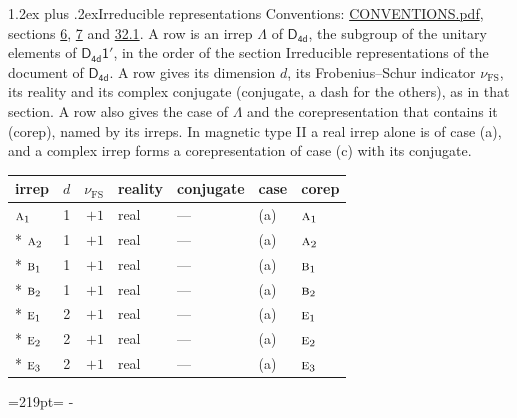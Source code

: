 \documentclass[10pt,a4paper]{article}
\makeatletter
\renewcommand\section{\@startsection{section}{1}{\z@}{-3ex plus -1ex minus -.2ex}%
  {1.2ex plus .2ex}{\normalfont\large\sffamily\bfseries\color{parttitle}}}
\newcommand{\needspace}[1]{\par\penalty-100\begingroup\dimen0=#1\relax\dimen2=\pagegoal
  \advance\dimen2-\pagetotal\ifdim\dimen0>\dimen2\relax\ifdim\dimen2>0pt\vfil\break\fi\fi
  \endgroup}
\numberwithin{equation}{section}
\newcommand{\grp}[1]{\mathsf{#1}}
\newcommand{\irr}[1]{\text{\normalfont\scshape #1}}
\newcommand{\fsind}{\nu_{\mathrm{FS}}}
\makeatother
\begin{document}
\section{Irreducible representations}\label{s:irreps}
Conventions: \href{../../CONVENTIONS.pdf}{CONVENTIONS.pdf}, sections \href{../../../rotation/CONVENTIONS.pdf\#conv.6}{6}, \href{../../../rotation/CONVENTIONS.pdf\#conv.7}{7} and \href{../../CONVENTIONS.pdf\#conv.32.1}{32.1}.
\leavevmode\label{n:irrep.Delta}A row is an irrep $\Lambda$ of $\grp{D_{4d}}$, the subgroup of the unitary elements of $\grp{D_{4d}1'}$, in the order of the section Irreducible representations of the document of \href{../../../rotation/data/pdf/D4d.pdf}{$\grp{D_{4d}}$}. \label{n:index.dimension}\label{n:index.frobenius}\label{n:head.irrep}\label{n:head.reality}\label{n:head.conjugate}A row gives its dimension $d$, its Frobenius--Schur indicator $\fsind$, its reality and its complex conjugate (conjugate, a dash for the others), as in that section. \label{n:head.case.corep}\label{n:head.corep}A row also gives the case of $\Lambda$ and the corepresentation that contains it (corep), named by its irreps. In magnetic type II a real irrep alone is of case (a), and a complex irrep forms a corepresentation of case (c) with its conjugate.
\setlength{\emergencystretch}{2em}\par\setlength{\emergencystretch}{0pt}
{\small\renewcommand{\arraystretch}{1.25}\setlength{\tabcolsep}{4pt}\begin{longtable}{@{}lrrllll@{}}\toprule
irrep & $d$ & $\fsind$ & reality & conjugate & case & corep\\\midrule\endhead
\bottomrule\endfoot\endlastfoot
$\irr{a}_{1}$ & 1 & $+1$ & real & --- & (a) & $\irr{a}_{1}$\\*
$\irr{a}_{2}$ & 1 & $+1$ & real & --- & (a) & $\irr{a}_{2}$\\*
$\irr{b}_{1}$ & 1 & $+1$ & real & --- & (a) & $\irr{b}_{1}$\\*
$\irr{b}_{2}$ & 1 & $+1$ & real & --- & (a) & $\irr{b}_{2}$\\*
$\irr{e}_{1}$ & 2 & $+1$ & real & --- & (a) & $\irr{e}_{1}$\\*
$\irr{e}_{2}$ & 2 & $+1$ & real & --- & (a) & $\irr{e}_{2}$\\*
$\irr{e}_{3}$ & 2 & $+1$ & real & --- & (a) & $\irr{e}_{3}$\\
\bottomrule\end{longtable}}
\needspace{219pt}
\end{document}
